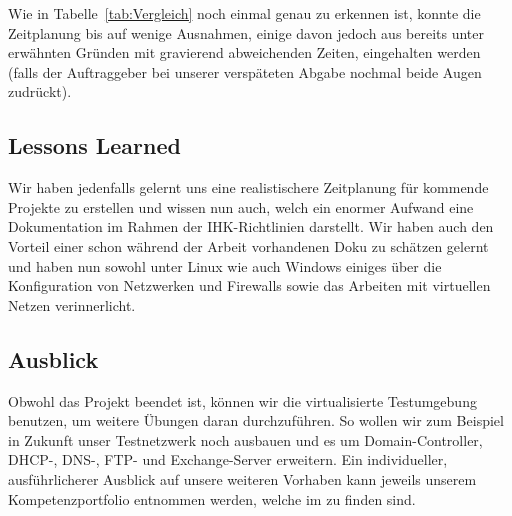 Wie in Tabelle~\ref{tab:Vergleich} noch einmal genau zu erkennen ist, konnte die Zeitplanung bis auf wenige Ausnahmen, einige davon jedoch aus bereits unter  erwähnten Gründen mit gravierend abweichenden Zeiten, eingehalten werden (falls der Auftraggeber bei unserer verspäteten Abgabe nochmal beide Augen zudrückt).


\subsection{Lessons Learned}
\label{sec:LessonsLearned}
Wir haben jedenfalls gelernt uns eine realistischere Zeitplanung für kommende Projekte zu erstellen und wissen nun auch, welch ein enormer Aufwand eine Dokumentation im Rahmen der \ac{IHK}-Richtlinien darstellt. Wir haben auch den Vorteil einer schon während der Arbeit vorhandenen Doku zu schätzen gelernt und haben nun sowohl unter Linux wie auch Windows einiges über die Konfiguration von Netzwerken und Firewalls sowie das Arbeiten mit virtuellen Netzen verinnerlicht.

\subsection{Ausblick}
\label{sec:Ausblick}
Obwohl das Projekt beendet ist, können wir die virtualisierte Testumgebung benutzen, um weitere Übungen daran durchzuführen. So wollen wir zum Beispiel in Zukunft unser Testnetzwerk noch ausbauen und es um Domain-Controller, \ac{DHCP}-, \ac{DNS}-, \ac{FTP}- und Exchange-Server erweitern. Ein individueller, ausführlicherer Ausblick auf unsere weiteren Vorhaben kann jeweils unserem Kompetenzportfolio entnommen werden, welche im  zu finden sind.

